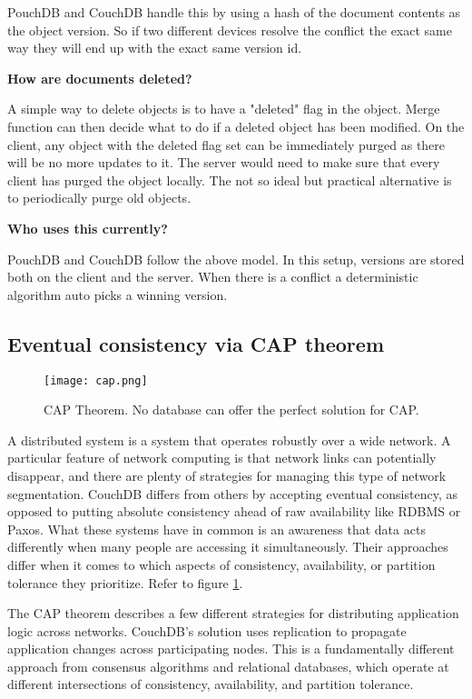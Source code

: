 PouchDB and CouchDB handle this by using a hash of the document contents as the object version. So if two 
different devices resolve the conflict the exact same way they will end up with the exact same version id.

\textbf{How are documents deleted?}

A simple way to delete objects is to have a "deleted" flag in the object. 
Merge function can then decide what to do if a deleted object has been modified. 
On the client, any object with the deleted flag set can be immediately purged as 
there will be no more updates to it. The server would need to make sure that every client has purged the object locally. 
The not so ideal but practical alternative is to periodically purge old objects.

\textbf{Who uses this currently?}

PouchDB and CouchDB follow the above model. In this setup, versions are stored both on the client and 
the server. When there is a conflict a deterministic algorithm auto picks a winning version.~\cite{HasuraOfflineFirst}

\subsection{Eventual consistency via CAP theorem}

\begin{figure}[h!]
    \begin{center}
        \texttt{[image: cap.png]}
    \end{center}
    \caption{CAP Theorem. No database can offer the perfect solution for CAP.}
    \label{fig:cap}
\end{figure}

A distributed system is a system that operates robustly over a wide network. 
A particular feature of network computing is that network links can potentially 
disappear, and there are plenty of strategies for managing this type of network 
segmentation. CouchDB differs from others by accepting eventual consistency, 
as opposed to putting absolute consistency ahead of raw availability like 
RDBMS or Paxos. What these systems have in common is an awareness that data 
acts differently when many people are accessing it simultaneously. 
Their approaches differ when it comes to which aspects of consistency, 
availability, or partition tolerance they prioritize. Refer to figure \ref{fig:cap}.

The CAP theorem describes a few different strategies for distributing application 
logic across networks. CouchDB’s solution uses replication to propagate application 
changes across participating nodes. This is a fundamentally different approach from 
consensus algorithms and relational databases, which operate at different intersections 
of consistency, availability, and partition tolerance.

